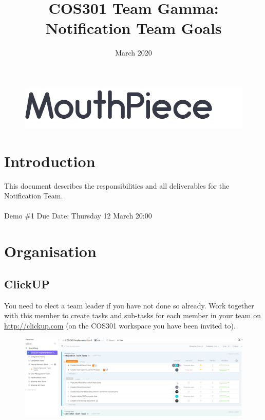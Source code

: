 \documentclass{article}
\begin{document}
\title{COS301 Team Gamma: Notification Team Goals}
\begin{figure}
    \centering
    \includegraphics[width=\textwidth]{logo.png}
\end{figure}
\date{March 2020}

\maketitle

\section{Introduction}
This document describes the responsibilities and all deliverables for the \\ Notification Team.
\\ \\
Demo \#1 Due Date: Thursday 12 March 20:00
\newpage

\section{Organisation}
\subsection{ClickUP}
You need to elect a team leader if you have not done so already. Work together with this member to create tasks and sub-tasks for each member in your team on \url{http://clickup.com} (on the COS301 workspace you have been invited to). \\

\begin{figure}[h]
    \centering
    \includegraphics[width=\textwidth]{clickup.png}
\end{figure}
\end{document}
